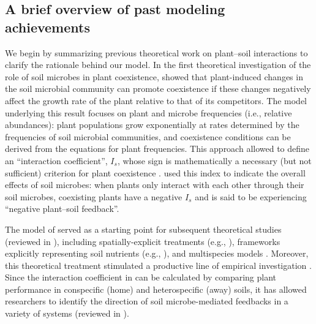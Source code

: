 \subsection{A brief overview of past modeling achievements}
We begin by summarizing previous theoretical work on plant--soil interactions to clarify the rationale behind our model.
In the first theoretical investigation of the role of soil microbes in plant coexistence, \citet{Bever1997} showed that plant-induced changes in the soil microbial community can promote coexistence if these changes negatively affect the growth rate of the plant relative to that of its competitors.
The model underlying this result focuses on plant and microbe frequencies (i.e., relative abundances): plant populations grow exponentially at rates determined by the frequencies of soil microbial communities, and coexistence conditions can be derived from the equations for plant frequencies. This approach allowed \citet{Bever1997} to define an ``interaction coefficient'', $I_{s}$, whose sign is mathematically a necessary (but not sufficient) criterion for plant coexistence \citep{Revilla2013, KeMiki2015}.
\citet{Bever1997} used this index to indicate the overall effects of soil microbes: when plants only interact with each other through their soil microbes, coexisting plants have a negative $I_{s}$ and is said to be experiencing ``negative plant--soil feedback''.
\par


The model of \citet{Bever1997} served as a starting point for subsequent theoretical studies (reviewed in \citealt{Bever2010, KeMiki2015}), including spatially-explicit treatments (e.g., \citealt{Eppinga2006}), frameworks explicitly representing soil nutrients (e.g., \citealt{Umbanhowar2005}), and multispecies models \citep{Kulmatiski2011, Eppinga2018}. Moreover, this theoretical treatment stimulated a productive line of empirical investigation \citep{Kulmatiski2008, vanderPutten2013}. Since the interaction coefficient in \citet{Bever1997} can be calculated by comparing plant performance in conspecific (home) and heterospecific (away) soils, it has allowed researchers to identify the direction of soil microbe-mediated feedbacks in a variety of systems (reviewed in \citealt{Bever2010, vanderPutten2013, Bever2015}).
\par


